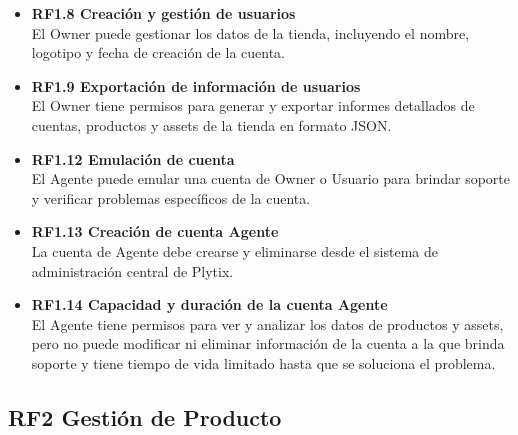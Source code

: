 \documentclass{article}
\begin{document}
\begin{itemize}
    \item \textbf{RF1.8 Creación y gestión de usuarios} \\
    El Owner puede gestionar los datos de la tienda, incluyendo el nombre, logotipo y fecha de creación de la cuenta.

    \item \textbf{RF1.9 Exportación de información de usuarios} \\
    El Owner tiene permisos para generar y exportar informes detallados de cuentas, productos y assets de la tienda en formato JSON.



    \item \textbf{RF1.12 Emulación de cuenta} \\
    El Agente puede emular una cuenta de Owner o Usuario para brindar soporte y verificar problemas específicos de la cuenta.

    \item \textbf{RF1.13 Creación de cuenta Agente} \\
    La cuenta de Agente debe crearse y eliminarse desde el sistema de administración central de Plytix.


    \item \textbf{RF1.14 Capacidad y duración de la cuenta Agente} \\
    El Agente tiene permisos para ver y analizar los datos de productos y assets, pero no puede modificar ni eliminar información de la cuenta a la que brinda soporte y tiene tiempo de vida limitado hasta que se soluciona el problema.
\end{itemize}

\subsection*{RF2 Gestión de Producto}
\end{document}
